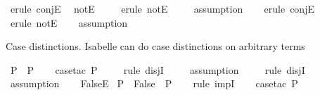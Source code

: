 \begin{isabellebody}
\ {\isacharparenleft}{\kern0pt}erule\ conjE{\isacharparenright}{\kern0pt}\ \isamarkupfalse%
\ notE\isanewline
\ \ \ \isamarkupfalse%
\ {\isacharparenleft}{\kern0pt}erule\ notE{\isacharparenright}{\kern0pt}\isanewline
\ \ \ \isamarkupfalse%
\ assumption\isanewline
\ \ \isamarkupfalse%
\ {\isacharparenleft}{\kern0pt}erule\ conjE{\isacharparenright}{\kern0pt}\isanewline
\ \ \isamarkupfalse%
\ {\isacharparenleft}{\kern0pt}erule\ notE{\isacharparenright}{\kern0pt}\isanewline
\ \ \isamarkupfalse%
\ assumption\isanewline
\ \ \isamarkupfalse%
%
\endisatagproof
{\isafoldproof}%
%
\isadelimproof
%
\endisadelimproof
%
\begin{isamarkuptext}%
Case distinctions.
Isabelle can do case distinctions on arbitrary terms%
\end{isamarkuptext}\isamarkuptrue%
\isamarkupfalse%
\ {\isachardoublequoteopen}P\ {\isasymor}\ {\isasymnot}P{\isachardoublequoteclose}\isanewline
%
\isadelimproof
\ \ %
\endisadelimproof
%
\isatagproof
{}\isamarkupfalse%
\ {\isacharparenleft}{\kern0pt}case{\isacharunderscore}{\kern0pt}tac\ {\isachardoublequoteopen}P{\isachardoublequoteclose}{\isacharparenright}{\kern0pt}\isanewline
\ \ \ \isamarkupfalse%
\ {\isacharparenleft}{\kern0pt}rule\ disjI{}{\isacharparenright}{\kern0pt}\isanewline
\ \ \ \isamarkupfalse%
\ {\isacharparenleft}{\kern0pt}assumption{\isacharparenright}{\kern0pt}\isanewline
\ \ \ \isamarkupfalse%
\ {\isacharparenleft}{\kern0pt}rule\ disjI{}{\isacharparenright}{\kern0pt}\isanewline
{}\isamarkupfalse%
\ {\isacharparenleft}{\kern0pt}assumption{\isacharparenright}{\kern0pt}\isanewline
\ \ \isamarkupfalse%
%
\endisatagproof
{\isafoldproof}%
%
\isadelimproof
\isanewline
%
\endisadelimproof
\isanewline
{}\isamarkupfalse%
\ FalseE\isanewline
\isanewline
{}\isamarkupfalse%
\ {\isachardoublequoteopen}{\isacharparenleft}{\kern0pt}{\isasymnot}P\ {\isasymlongrightarrow}\ False{\isacharparenright}{\kern0pt}\ {\isasymlongrightarrow}\ P{\isachardoublequoteclose}\isanewline
%
\isadelimproof
\ \ %
\endisadelimproof
%
\isatagproof
{}\isamarkupfalse%
\ {\isacharparenleft}{\kern0pt}rule\ impI{\isacharparenright}{\kern0pt}\isanewline
\ \ \isamarkupfalse%
\ {\isacharparenleft}{\kern0pt}case{\isacharunderscore}{\kern0pt}tac\ P{\isacharparenright}{\kern0pt}\isanewline

\end{isabellebody}
